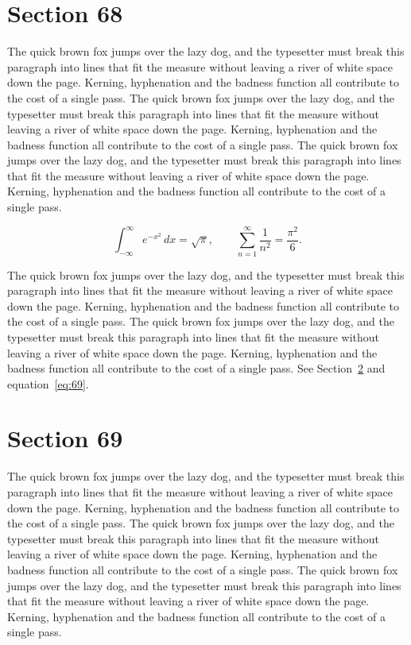 \documentclass{article}
\begin{document}
\section{Section 68}
\label{sec:68}
The quick brown fox jumps over the lazy dog, and the typesetter must break this paragraph into lines that fit the measure without leaving a river of white space down the page. Kerning, hyphenation and the badness function all contribute to the cost of a single pass. The quick brown fox jumps over the lazy dog, and the typesetter must break this paragraph into lines that fit the measure without leaving a river of white space down the page. Kerning, hyphenation and the badness function all contribute to the cost of a single pass. The quick brown fox jumps over the lazy dog, and the typesetter must break this paragraph into lines that fit the measure without leaving a river of white space down the page. Kerning, hyphenation and the badness function all contribute to the cost of a single pass. 

\begin{equation}\label{eq:68}
\int_{-\infty}^{\infty} e^{-x^{2}}\,dx = \sqrt{\pi}, \qquad
\sum_{n=1}^{\infty} \frac{1}{n^{2}} = \frac{\pi^{2}}{6}.
\end{equation}

The quick brown fox jumps over the lazy dog, and the typesetter must break this paragraph into lines that fit the measure without leaving a river of white space down the page. Kerning, hyphenation and the badness function all contribute to the cost of a single pass. The quick brown fox jumps over the lazy dog, and the typesetter must break this paragraph into lines that fit the measure without leaving a river of white space down the page. Kerning, hyphenation and the badness function all contribute to the cost of a single pass. 
See Section~\ref{sec:69} and equation~\eqref{eq:69}.
\section{Section 69}
\label{sec:69}
The quick brown fox jumps over the lazy dog, and the typesetter must break this paragraph into lines that fit the measure without leaving a river of white space down the page. Kerning, hyphenation and the badness function all contribute to the cost of a single pass. The quick brown fox jumps over the lazy dog, and the typesetter must break this paragraph into lines that fit the measure without leaving a river of white space down the page. Kerning, hyphenation and the badness function all contribute to the cost of a single pass. The quick brown fox jumps over the lazy dog, and the typesetter must break this paragraph into lines that fit the measure without leaving a river of white space down the page. Kerning, hyphenation and the badness function all contribute to the cost of a single pass. 
\end{document}
